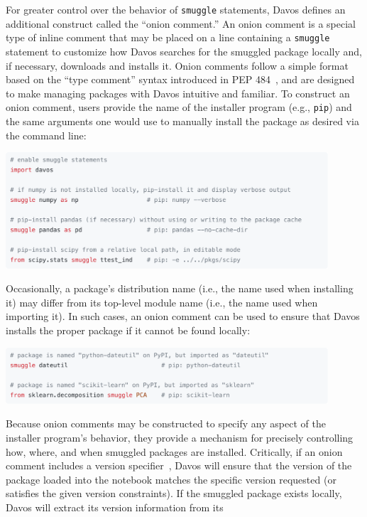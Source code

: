 \documentclass[preprint,12pt,a4paper]{elsarticle}
\begin{document}
For greater control over the behavior of \texttt{smuggle} statements, Davos
defines an additional construct called the ``onion comment.'' An onion comment
is a special type of inline comment that may be placed on a line containing a
\texttt{smuggle} statement to customize how Davos searches for the smuggled
package locally and, if necessary, downloads and installs it. Onion comments
follow a simple format based on the ``type comment'' syntax introduced in PEP
484~\cite{vanREtal14}, and are designed to make managing packages with Davos
intuitive and familiar. To construct an onion comment, users provide the name
of the installer program (e.g., \texttt{pip}) and the same arguments one would
use to manually install the package as desired via the command line:
\begin{center}
  \includegraphics[width=0.9\textwidth]{figs/snippet1}
\end{center}
Occasionally, a package's distribution name (i.e., the name used
when installing it) may differ from its top-level module name (i.e., the name
used when importing it). In such cases, an onion comment can be used to ensure
that Davos installs the proper package if it cannot be found locally:
\begin{center}
  \includegraphics[width=0.9\textwidth]{figs/snippet2}
\end{center}
Because onion comments may be constructed to specify any aspect of
the installer program's behavior, they provide a mechanism for precisely controlling
how, where, and when smuggled packages are installed. Critically, if an onion
comment includes a version specifier~\cite{CoghStuf13}, Davos will ensure that
the version of the package loaded into the notebook matches the specific
version requested (or satisfies the given version constraints). If the smuggled
package exists locally, Davos will extract its version information from its
\end{document}
